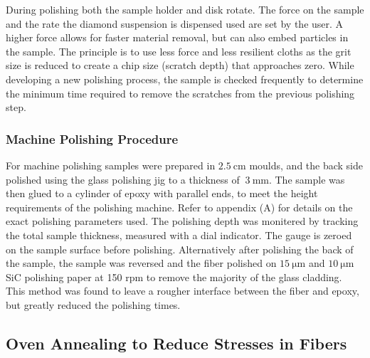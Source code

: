 During polishing both the sample holder and disk rotate. The force on the sample and the rate the diamond suspension is dispensed used are set by the user. A higher force allows for faster material removal, but can also embed particles in the sample. The principle is to use less force and less resilient cloths as the grit size is reduced to create a chip size (scratch depth) that approaches zero. While developing a new polishing process, the sample is checked frequently to determine the minimum time required to remove the scratches from the previous polishing step. 

\subsubsection{Machine Polishing Procedure}
For machine polishing samples were prepared in $\SI{2.5}{\cm}$ moulds, and the back side polished using the glass polishing jig to a thickness of $~\SI{3}{\mm}$. The sample was then glued to a cylinder of epoxy with parallel ends, to meet the height requirements of the polishing machine. Refer to appendix (A) for details on the exact polishing parameters used. The polishing depth was monitered by tracking the total sample thickness, measured with a dial indicator. The gauge is zeroed on the sample surface before polishing. Alternatively after polishing the back of the sample, the sample was reversed and the fiber polished on $\SI{15}{\micro\meter}$ and $\SI{10}{\micro\meter}$ SiC polishing paper at 150 rpm to remove the majority of the glass cladding. This method was found to leave a rougher interface between the fiber and epoxy, but greatly reduced the polishing times. 


\subsection{Oven Annealing to Reduce Stresses in Fibers} \label{ovenanneal}

